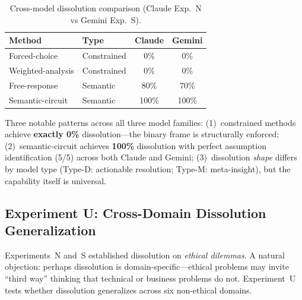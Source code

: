 \documentclass[11pt,a4paper]{article}
\begin{document}
\begin{table}[H]
\centering
\caption{Cross-model dissolution comparison (Claude Exp.~N vs Gemini Exp.~S).}
\begin{tabular}{llcc}
\toprule
\textbf{Method} & \textbf{Type} & \textbf{Claude} & \textbf{Gemini} \\
\midrule
Forced-choice     & Constrained & 0\%  & 0\% \\
Weighted-analysis & Constrained & 0\%  & 0\% \\
Free-response     & Semantic    & 80\% & 70\% \\
Semantic-circuit  & Semantic    & 100\% & 100\% \\
\bottomrule
\end{tabular}
\label{tab:cross-dissolution}
\end{table}

Three notable patterns across all three model families: (1)~constrained methods achieve \textbf{exactly 0\%} dissolution---the binary frame is structurally enforced; (2)~semantic-circuit achieves \textbf{100\%} dissolution with perfect assumption identification (5/5) across both Claude and Gemini; (3)~dissolution \emph{shape} differs by model type (Type-D: actionable resolution; Type-M: meta-insight), but the capability itself is universal.

\subsection{Experiment U: Cross-Domain Dissolution Generalization}
\label{sec:cross-domain-dissolution}

Experiments~N and~S established dissolution on \emph{ethical dilemmas}. A natural objection: perhaps dissolution is domain-specific---ethical problems may invite ``third way'' thinking that technical or business problems do not. Experiment~U tests whether dissolution generalizes across six non-ethical domains.
\end{document}
